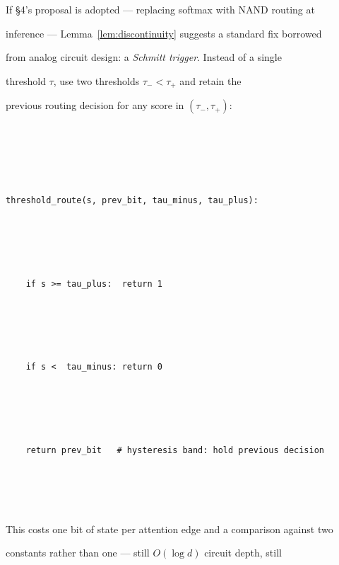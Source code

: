 \documentclass[11pt]{article}
\theoremstyle{definition}
\begin{document}
If \S4's proposal is adopted --- replacing softmax with NAND routing at





inference --- Lemma~\ref{lem:discontinuity} suggests a standard fix borrowed





from analog circuit design: a \emph{Schmitt trigger}. Instead of a single





threshold $\tau$, use two thresholds $\tau_- < \tau_+$ and retain the





previous routing decision for any score in $(\tau_-, \tau_+)$:











\begin{lstlisting}





threshold_route(s, prev_bit, tau_minus, tau_plus):





    if s >= tau_plus:  return 1





    if s <  tau_minus: return 0





    return prev_bit   # hysteresis band: hold previous decision





\end{lstlisting}











This costs one bit of state per attention edge and a comparison against two





constants rather than one --- still $O(\log d)$ circuit depth, still
\end{document}
